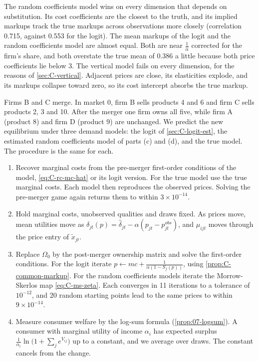 The random coefficients model wins on every dimension that depends on substitution. Its cost coefficients are the
closest to the truth, and its implied markups track the true markups across observations more closely (correlation
0.715, against 0.553 for the logit). The mean markups of the logit and the random coefficients model are almost equal.
Both are near $\frac{1}{\hat\alpha}$ corrected for the firm's share, and both overstate the true mean of 0.386 a little
because both price coefficients lie below 3. The vertical model fails on every dimension, for the reasons of
\cref{sec:C-vertical}. Adjacent prices are close, its elasticities explode, and its markups collapse toward zero, so
its cost intercept absorbs the true markup.

Firms B and C merge. In market 0, firm B sells products 4 and 6 and firm C sells products 2, 3 and 10. After the merger
one firm owns all five, while firm A (product 8) and firm D (product 9) are unchanged. We predict the new equilibrium
under three demand models: the logit of \cref{sec:C-logit-est}, the estimated random coefficients model of parts (c) and
(d), and the true model. The procedure is the same for each.
\begin{enumerate}
  \item Recover marginal costs from the pre-merger first-order conditions of the model, \eqref{eq:C-rc-mc-hat} or its
  logit version. For the true model use the true marginal costs. Each model then reproduces the observed prices.
  Solving the pre-merger game again returns them to within $3\times10^{-14}$.
  \item Hold marginal costs, unobserved qualities and draws fixed. As prices move, mean utilities move as
  $\delta_{jt}(p) = \hat\delta_{jt} - \alpha(p_{jt} - p^{obs}_{jt})$, and $\mu_{ijt}$ moves through the price entry of
  $\tilde x_{jt}$.
  \item Replace $\Omega_0$ by the post-merger ownership matrix and solve the first-order conditions. For the logit
  iterate $p \leftarrow mc + \frac{1}{\alpha(1 - S_f(p))}$, using \cref{prop:C-common-markup}. For the random
  coefficients models iterate the Morrow-Skerlos map \eqref{eq:C-ms-zeta}. Each converges in 11 iterations to a tolerance
  of $10^{-12}$, and 20 random starting points lead to the same prices to within $9\times10^{-14}$.
  \item Measure consumer welfare by the log-sum formula (\cref{prop:07-logsum}). A consumer with marginal utility of
  income $\alpha_i$ has expected surplus $\frac{1}{\alpha_i}\ln\big(1 + \sum_je^{V_{ij}}\big)$ up to a constant, and we
  average over draws. The constant cancels from the change.
\end{enumerate}

